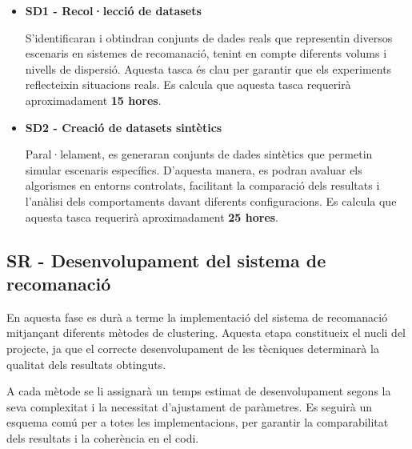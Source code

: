 \documentclass[a4paper,12pt]{report}
\begin{document}
\begin{itemize}
    \item \textbf{SD1 - Recol·lecció de datasets}
    
    S’identificaran i obtindran conjunts de dades reals que representin diversos escenaris en sistemes de recomanació, tenint en compte diferents volums i nivells de dispersió.
    Aquesta tasca és clau per garantir que els experiments reflecteixin situacions reals.
    Es calcula que aquesta tasca requerirà aproximadament \textbf{15 hores}.

    \item \textbf{SD2 - Creació de datasets sintètics}
    
    Paral·lelament, es generaran conjunts de dades sintètics que permetin simular escenaris específics.
    D’aquesta manera, es podran avaluar els algorismes en entorns controlats, facilitant la comparació dels resultats i l’anàlisi dels comportaments davant diferents configuracions.
    Es calcula que aquesta tasca requerirà aproximadament \textbf{25 hores}.
\end{itemize}

\subsection{SR - Desenvolupament del sistema de recomanació}

En aquesta fase es durà a terme la implementació del sistema de recomanació mitjançant diferents mètodes de clustering.
Aquesta etapa constitueix el nucli del projecte, ja que el correcte desenvolupament de les tècniques determinarà la qualitat dels resultats obtinguts.

A cada mètode se li assignarà un temps estimat de desenvolupament segons la seva complexitat i la necessitat d'ajustament de paràmetres.
Es seguirà un esquema comú per a totes les implementacions, per garantir la comparabilitat dels resultats i la coherència en el codi.
\end{document}
